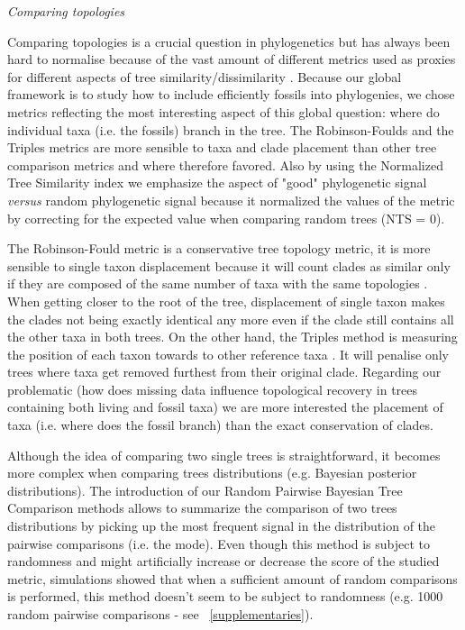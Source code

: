 \documentclass[12pt,letterpaper]{article}
\renewcommand{\subsection}[1]{%
\bigskip
\begin{center}
\begin{large}
\normalfont\itshape #1
\end{large}
\end{center}}
\begin{document}
\subsection{Comparing topologies} %
Comparing topologies is a crucial question in phylogenetics but has always been hard to normalise because of the vast amount of different metrics used as proxies for different aspects of tree similarity/dissimilarity \citep{agapowpower2002}.
Because our global framework is to study how to include efficiently fossils into phylogenies, we chose metrics reflecting the most interesting aspect of this global question: where do individual taxa (i.e. the fossils) branch in the tree.
The Robinson-Foulds \citep{RF1981} and the Triples \citep{critchlowthe1996} metrics are more sensible to taxa and clade placement than other tree comparison metrics \citep[e.g.][Imbalance metric]{kirkpatricksearching1993} and where therefore favored.
Also by using the Normalized Tree Similarity index \citep{Bogdanowicz2012} we emphasize the aspect of "good" phylogenetic signal \textit{versus} random phylogenetic signal because it normalized the values of the metric by correcting for the expected value when comparing random trees (NTS = 0).

The Robinson-Fould metric is a conservative tree topology metric, it is more sensible to single taxon displacement because it will count clades as similar only if they are composed of the same number of taxa with the same topologies \citep{RF1981}.
When getting closer to the root of the tree, displacement of single taxon makes the clades not being exactly identical any more even if the clade still contains all the other taxa in both trees.
On the other hand, the Triples method is measuring the position of each taxon towards to other reference taxa \citep{critchlowthe1996}.
It will penalise only trees where taxa get removed furthest from their original clade.
Regarding our problematic (how does missing data influence topological recovery in trees containing both living and fossil taxa) we are more interested the placement of taxa (i.e. where does the fossil branch) than the exact conservation of clades.


Although the idea of comparing two single trees is straightforward, it becomes more complex when comparing trees distributions (e.g. Bayesian posterior distributions).
The introduction of our Random Pairwise Bayesian Tree Comparison methods allows to summarize the comparison of two trees distributions by picking up the most frequent signal in the distribution of the pairwise comparisons (i.e. the mode).
Even though this method is subject to randomness and might artificially increase or decrease the score of the studied metric, simulations showed that when a sufficient amount of random comparisons is performed, this method doesn't seem to be subject to randomness (e.g. 1000 random pairwise comparisons - see ~\ref{supplementaries}).
\end{document}
